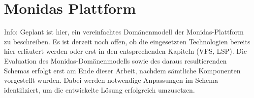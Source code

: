 \section{Monidas Plattform}

Info:
Geplant ist hier, ein vereinfachtes Domänenmodell der Monidas-Plattform zu beschreiben. Es ist derzeit noch offen, ob die eingesetzten Technologien bereits hier erläutert werden oder erst in den entsprechenden Kapiteln (VFS, LSP). Die Evaluation des Monidas-Domänenmodells sowie des daraus resultierenden Schemas erfolgt erst am Ende dieser Arbeit, nachdem sämtliche Komponenten vorgestellt wurden. Dabei werden notwendige Anpassungen im Schema identifiziert, um die entwickelte Lösung erfolgreich umzusetzen.